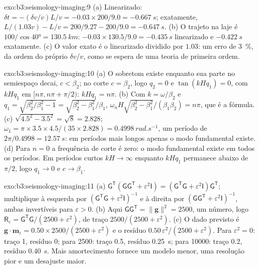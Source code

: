 \begin{solution}{exo:b3:seismology-imaging:9}
(a) Linearizado: $\delta t = -(\delta v/v)L/v = -0.03\times200/9.0 =
\qty{-0.667}{s}$; exatamente, $L/(1.03v) - L/v = 200/9.27 - 200/9.0 =
\qty{-0.647}{s}$. (b) O trajeto na laje é $100/\cos\ang{40} =
\qty{130.5}{km}$: $-0.03\times130.5/9.0 = \qty{-0.435}{s}$ linearizado e
$\qty{-0.422}{s}$ exatamente. (c) O valor exato é o linearizado dividido por
$1.03$: um erro de \qty{3}{\percent}, da ordem do próprio $\delta v/v$, como
se espera de uma teoria de primeira ordem.
\end{solution}

\begin{solution}{exo:b3:seismology-imaging:10}
(a) O sobretom existe enquanto sua parte no semiespaço decai, $c < \beta_2$; no
corte $c = \beta_2$, logo $q_2 = 0$ e $\tan(kHq_1) = 0$, com $kHq_1$ em
$[n\pi, n\pi + \pi/2)$: $kHq_1 = n\pi$. (b) Com $k = \omega/\beta_2$ e
$q_1 = \sqrt{\beta_2^2/\beta_1^2 - 1} = \sqrt{\beta_2^2 - \beta_1^2}/\beta_1$,
$\omega_nH\sqrt{\beta_2^2 - \beta_1^2}/(\beta_1\beta_2) = n\pi$, que é a
fórmula. (c) $\sqrt{4.5^2 - 3.5^2} = \sqrt8 = 2.828$; $\omega_1 =
\pi\times3.5\times4.5/(35\times2.828) = \qty{0.4998}{rad.s^{-1}}$, um período de
$2\pi/0.4998 = \qty{12.57}{s}$: em períodos mais longos apenas o modo fundamental
existe. (d) Para $n = 0$ a frequência de corte é zero: o modo fundamental
existe em todos os períodos. Em períodos curtos $kH \to \infty$ enquanto $kHq_1$ permanece
abaixo de $\pi/2$, logo $q_1 \to 0$ e $c \to \beta_1$.
\end{solution}

\begin{solution}{exo:b3:seismology-imaging:11}
(a) $\mathsf G^{\mathsf T}(\mathsf G\mathsf G^{\mathsf T} + \varepsilon^2\mathsf I)
= (\mathsf G^{\mathsf T}\mathsf G + \varepsilon^2\mathsf I)\mathsf G^{\mathsf T}$;
multiplique à esquerda por $(\mathsf G^{\mathsf T}\mathsf G + \varepsilon^2
\mathsf I)^{-1}$ e à direita por $(\mathsf G\mathsf G^{\mathsf T} +
\varepsilon^2\mathsf I)^{-1}$, ambas invertíveis para $\varepsilon > 0$.
(b) Aqui $\mathsf G\mathsf G^{\mathsf T} = \|\mathbf g\|^2 = 2500$, um número,
logo $\mathsf R_\varepsilon = \mathsf G^{\mathsf T}\mathsf G/(2500 + \varepsilon^2)$,
de traço $2500/(2500 + \varepsilon^2)$. (c) O dado previsto é
$\mathbf g\cdot\mathbf m_\varepsilon = 0.50\times2500/(2500 + \varepsilon^2)$
e o resíduo $0.50\,\varepsilon^2/(2500 + \varepsilon^2)$. Para
$\varepsilon^2 = 0$: traço 1, resíduo 0; para 2500: traço 0.5, resíduo
\qty{0.25}{s}; para \num{10000}: traço 0.2, resíduo \qty{0.40}{s}. Mais amortecimento
fornece um modelo menor, uma resolução pior e um desajuste maior.
\end{solution}

